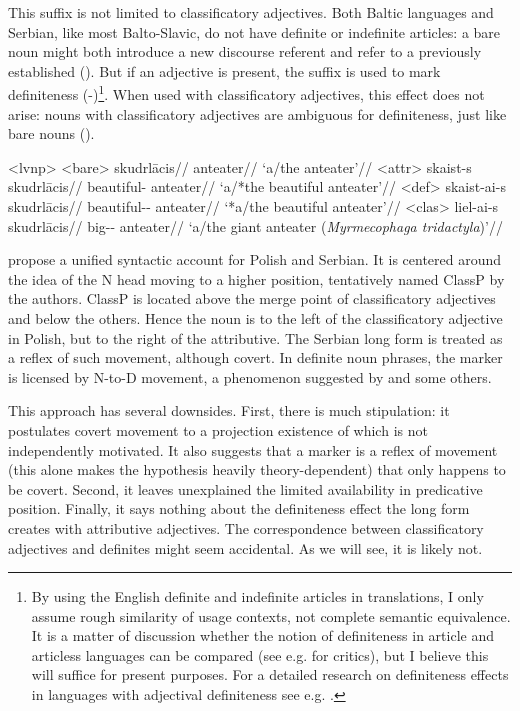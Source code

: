 \documentclass[a4paper, 12pt]{article}
\begin{document}
This suffix is not limited to classificatory adjectives. Both Baltic languages and Serbian, like most Balto-Slavic, do not have definite or indefinite articles: a bare noun might both introduce a new discourse referent and refer to a previously established (). But if an adjective is present, the suffix is used to mark definiteness (-)\footnote{By using the English definite and indefinite articles in translations, I only assume rough similarity of usage contexts, not complete semantic equivalence. It is a matter of discussion whether the notion of definiteness in article and articless languages can be compared (see e.g. \cite{simik2021uniquenessmaximalitygerman} for critics), but I believe this will suffice for present purposes. For a detailed research on definiteness effects in languages with adjectival definiteness see e.g. \textcite{holvoet2012semanticmapdefinite}.}. When used with classificatory adjectives, this effect does not arise: nouns with classificatory adjectives are ambiguous for definiteness, just like bare nouns ().

\pex<lvnp>
    \a<bare> \begingl
        \gla skudrlācis//
        \glb anteater//
        \glft `a/the anteater'//
    \endgl
    \a<attr> \begingl
        \gla skaist-s skudrlācis//
        \glb beautiful-\Nom{} anteater//
        \glft `a/*the beautiful anteater'//
    \endgl
    \a<def> \begingl
        \gla skaist-ai-s skudrlācis//
        \glb beautiful-\Def-\Nom{} anteater//
        \glft `*a/the beautiful anteater'//
    \endgl
    \a<clas> \begingl
        \gla liel-ai-s skudrlācis//
        \glb big-\Def-\Nom{} anteater//
        \glft `a/the giant anteater (\textit{Myrmecophaga tridactyla})'//
    \endgl
\xe

 propose a unified syntactic account for Polish and Serbian. It is centered around the idea of the N head moving to a higher position, tentatively named ClassP by the authors. ClassP is located above the merge point of classificatory adjectives and below the others. Hence the noun is to the left of the classificatory adjective in Polish, but to the right of the attributive. The Serbian long form is treated as a reflex of such movement, although covert. In definite noun phrases, the marker is licensed by N-to-D movement, a phenomenon suggested by \textcite{longobardi1994referencepropernames} and some others.

This approach has several downsides. First, there is much stipulation: it postulates covert movement to a projection existence of which is not independently motivated. It also suggests that a marker is a reflex of movement (this alone makes the hypothesis heavily theory-dependent) that only happens to be covert. Second, it leaves unexplained the limited availability in predicative position. Finally, it says nothing about the definiteness effect the long form creates with attributive adjectives. The correspondence between classificatory adjectives and definites might seem accidental. As we will see, it is likely not.
\end{document}
